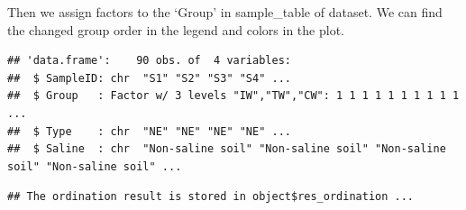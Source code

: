 \documentclass[
]{book}
\newenvironment{Shaded}{\begin{snugshade}}{\end{snugshade}}
\newcommand{\AttributeTok}[1]{\textcolor[rgb]{0.77,0.63,0.00}{#1}}
\newcommand{\FunctionTok}[1]{\textcolor[rgb]{0.00,0.00,0.00}{#1}}
\newcommand{\NormalTok}[1]{#1}
\newcommand{\OtherTok}[1]{\textcolor[rgb]{0.56,0.35,0.01}{#1}}
\newcommand{\SpecialCharTok}[1]{\textcolor[rgb]{0.00,0.00,0.00}{#1}}
\newcommand{\StringTok}[1]{\textcolor[rgb]{0.31,0.60,0.02}{#1}}
\begin{document}
Then we assign factors to the `Group' in sample\_table of dataset.
We can find the changed group order in the legend and colors in the plot.

\begin{Shaded}
\end{Shaded}

\begin{verbatim}
## 'data.frame':    90 obs. of  4 variables:
##  $ SampleID: chr  "S1" "S2" "S3" "S4" ...
##  $ Group   : Factor w/ 3 levels "IW","TW","CW": 1 1 1 1 1 1 1 1 1 1 ...
##  $ Type    : chr  "NE" "NE" "NE" "NE" ...
##  $ Saline  : chr  "Non-saline soil" "Non-saline soil" "Non-saline soil" "Non-saline soil" ...
\end{verbatim}

\begin{Shaded}
\end{Shaded}

\begin{verbatim}
## The ordination result is stored in object$res_ordination ...
\end{verbatim}

\begin{Shaded}
\end{Shaded}
\end{document}
